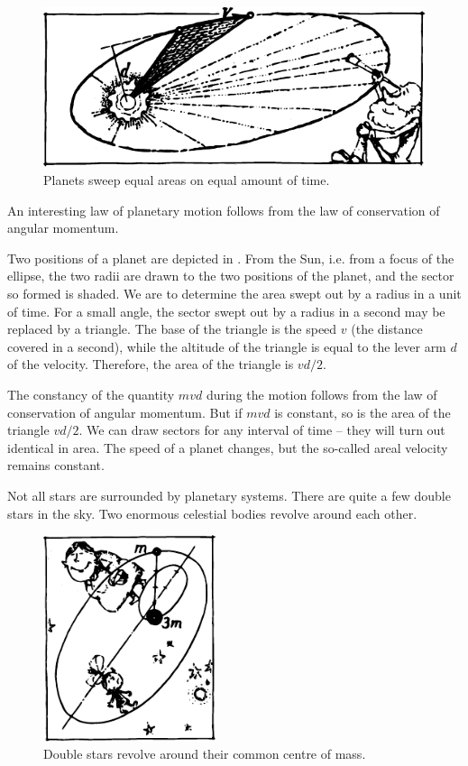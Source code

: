  \begin{figure}[!ht]
 \centering
 \includegraphics[width=\textwidth]{figures/fig-6-7.pdf}
 \caption{Planets sweep equal areas on equal amount of time.}
 \label{fig-6-7}
 \end{figure}


An interesting law of planetary motion follows from
the law of conservation of angular momentum.

Two positions of a planet are depicted in .
From the Sun, i.e. from a focus of the ellipse, the two
radii are drawn to the two positions of the planet, and
the sector so formed is shaded. We are to determine the
area swept out by a radius in a unit of time. For a small
angle, the sector swept out by a radius in a second may
be replaced by a triangle. The base of the triangle is
the speed $v$ (the distance covered in a second), while
the altitude of the triangle is equal to the lever arm $d$
of the velocity. Therefore, the area of the triangle is $vd/2$.

The constancy of the quantity $mvd$ during the motion
follows from the law of conservation of angular momentum. But if $mvd$ is constant, so is the area of the triangle $vd/2$. We can draw sectors for any interval of time -- they
will turn out identical in area. The speed of a planet changes, but the so-called areal velocity remains constant.

Not all stars are surrounded by planetary systems. There are quite a few double stars in the sky. Two enormous celestial bodies revolve around each other.
 \begin{figure}[!ht]
 \centering
 \includegraphics[width=0.45\textwidth]{figures/fig-6-8.pdf}
 \caption{Double stars revolve around their common centre of mass.}
 \label{fig-6-8}
 \end{figure}


